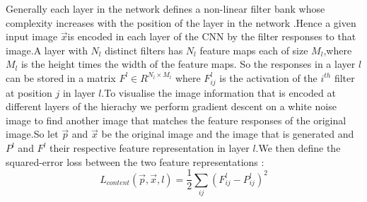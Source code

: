 \documentclass[conference]{IEEEtran}
\begin{document}
Generally each layer in the network defines a non-linear filter bank whose 
complexity increases with the position of the layer in the network .Hence a given input image $\overrightarrow{x}$is encoded in each layer of the CNN by the filter responses to that image.A layer with $N_l$ distinct filters has
$N_l$ feature maps each of size $M_l$,where $M_l$ is the height times 
the width of the feature maps. So the responses in a layer $l$ can be stored in a matrix $F^l \in R^{N_l\times M_l}$ where $F_{ij}^{l}$ is the 
activation of the $i^{th}$ filter at position $j$ in layer $l$.To visualise
the image information that is encoded at different layers of the hierachy we perform gradient descent on a white noise image to find another image 
that matches the feature responses of the original image.So let $\overrightarrow{p}$ and $\overrightarrow{x}$ be the original image and the image that is generated and $P^l$ and $F^l$ their respective feature 
representation in layer $l$.We then define the squared-error loss between the two feature representations :
\begin{equation}
L_{content} (\overrightarrow{p},\overrightarrow{x},l)= \frac{1}{2} \sum_{ij}
(F_{ij}^{l}-P_{ij}^{l})^2
\end{equation}



%
%

\end{document}
